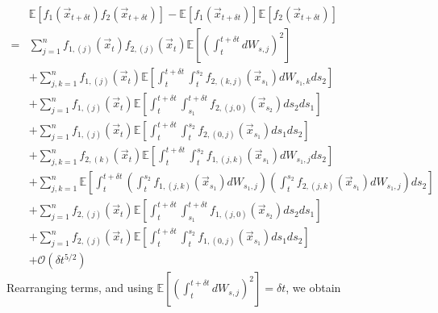 \documentclass[12pt]{article}
\begin{document}
\begin{equation}
\begin{aligned}
&\mathbb{E} \left[ f_1(\vec{x}_{t + \delta t}) f_2(\vec{x}_{t + \delta t}) \right] 
- \mathbb{E} \left[ f_1(\vec{x}_{t + \delta t}) \right] \mathbb{E} \left[ f_2(\vec{x}_{t + \delta t}) \right] \\
=& 
 \sum_{j=1}^n f_{1,(j)}(\vec{x}_t) f_{2,(j)}(\vec{x}_t) \mathbb{E} \left[ \left( \int_t^{t + \delta t} dW_{s,j} \right)^2 \right] \\
&+ \sum_{j,k=1}^n f_{1,(j)}(\vec{x}_t) \mathbb{E} \left[  \int_t^{t+\delta t} \int_t^{s_2} f_{2,(k,j)}(\vec{x}_{s_1}) dW_{s_1, k} ds_2 \right] \\
&+ \sum_{j=1}^n f_{1,(j)}(\vec{x}_t) \mathbb{E} \left[ \int_t^{t+\delta t} \int_{s_1}^{t+\delta t} f_{2,(j,0)}(\vec{x}_{s_2}) ds_2 ds_1 \right]\\
&+ \sum_{j=1}^n f_{1,(j)}(\vec{x}_t) \mathbb{E} \left[  \int_t^{t+\delta t} \int_t^{s_2} f_{2,(0,j)}(\vec{x}_{s_1}) ds_1 ds_2\right] \\
&+  \sum_{j, k=1}^n  f_{2,(k)}(\vec{x}_t)\mathbb{E} \left[ \int_t^{t+\delta t} \int_t^{s_2} f_{1,(j,k)}(\vec{x}_{s_1}) dW_{s_1, j} ds_2 \right] \\
&+ \sum_{j, k=1}^n \mathbb{E} \left[ \int_t^{t+\delta t}\left( \int_t^{s_2} f_{1,(j,k)}(\vec{x}_{s_1}) dW_{s_1, j}  \right) \left(  \int_t^{s_2} f_{2,(j,k)}(\vec{x}_{s_1}) dW_{s_1, j} \right) ds_2 \right] \\
&+  \sum_{j=1}^n f_{2,(j)}(\vec{x}_t) \mathbb{E} \left[ \int_t^{t+\delta t} \int_{s_1}^{t + \delta t} f_{1,(j,0)}(\vec{x}_{s_2}) ds_2 ds_1 \right]\\
&+   \sum_{j=1}^n  f_{2,(j)}(\vec{x}_t) \mathbb{E} \left[ \int_t^{t+\delta t} \int_t^{s_2} f_{1,(0,j)}(\vec{x}_{s_1}) ds_1 ds_2 \right] \\
&+ \mathcal{O} (\delta t^{5/2})
\end{aligned}
\end{equation}
%
Rearranging terms, and using $\mathbb{E} \left[ \left( \int_t^{t + \delta t} dW_{s,j} \right)^2 \right] = \delta t$, we obtain
\end{document}

